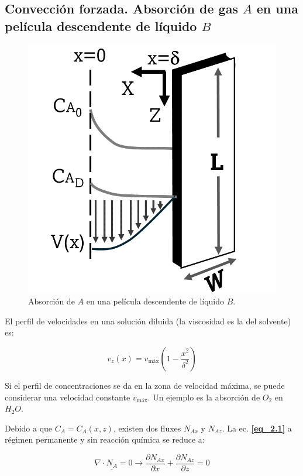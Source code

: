 \subsection{Convección forzada. Absorción de gas $A$ en una película descendente de líquido $B$}

\begin{figure}[H]
	\centering
	\includegraphics[scale=0.2]{./Capitulo2/Imagenes/fig-2-4.PNG}
	\caption{Absorción de $A$ en una película descendente de líquido $B$.}
\end{figure}

El perfil de velocidades en una solución diluida (la viscosidad es la del solvente) es:

\begin{equation}
v_z(x) = v_{\text{máx}} \left( 1 - \frac{x^2}{\delta^2} \right)
\end{equation}

Si el perfil de concentraciones se da en la zona de velocidad máxima, se puede considerar una velocidad constante $v_{\text{máx}}$. Un ejemplo es la absorción de $O_2$ en $H_2O$.

Debido a que $C_A = C_A(x,z)$, existen dos fluxes $N_{Ax}$ y $N_{Az}$. La ec. \textbf{\eqref{eq_2.1}} a régimen permanente y sin reacción química se reduce a:

\begin{equation}
	\nabla \cdot \underline{N_A} = 0 \to \frac{\partial N_{Ax}}{\partial x} + \frac{\partial N_{Az}}{\partial z} = 0
\end{equation}

